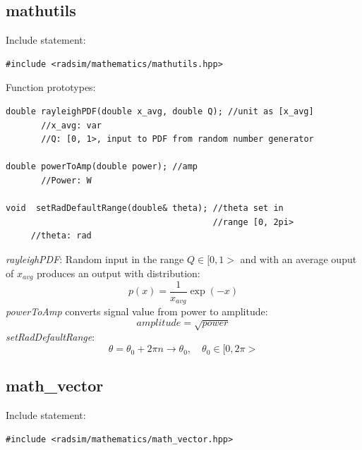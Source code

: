 \documentclass[letterpaper]{book}
\begin{document}
\subsection{mathutils}
Include statement:
\begin{lstlisting}
#include <radsim/mathematics/mathutils.hpp>
\end{lstlisting}
Function prototypes:
\begin{lstlisting}
double rayleighPDF(double x_avg, double Q); //unit as [x_avg]
       //x_avg: var
       //Q: [0, 1>, input to PDF from random number generator

double powerToAmp(double power); //amp
       //Power: W

void  setRadDefaultRange(double& theta); //theta set in 
                                         //range [0, 2pi>
     //theta: rad
\end{lstlisting}
\textit{rayleighPDF}: Random input in the range \(Q \in [0, 1> \) and with an average ouput of \(x_{avg}\) produces an output with distribution:
\begin{equation}
p(x) = \frac{1}{x_{avg}}\exp{(-x)}
\end{equation}
\textit{powerToAmp} converts signal value from power to amplitude:
\begin{equation}
amplitude = \sqrt{power}
\end{equation}
\textit{setRadDefaultRange}:
\begin{equation}
\theta = \theta_{0} + 2 \pi n \rightarrow \theta_{0}, \quad \theta_{0} \in [0, 2\pi>
\end{equation}




\subsection{math\_vector}
Include statement:
\begin{lstlisting}
#include <radsim/mathematics/math_vector.hpp>
\end{lstlisting}
\end{document}
